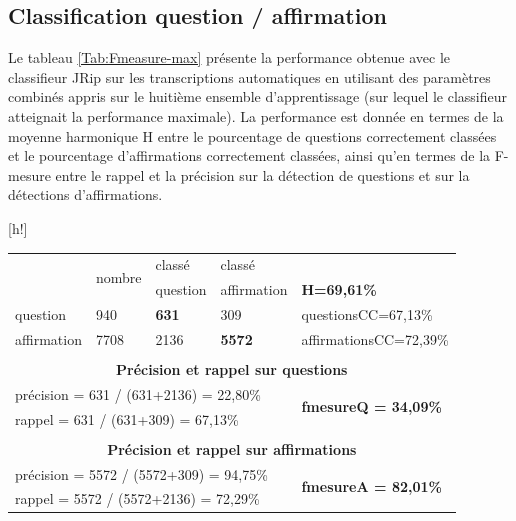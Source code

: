 \documentclass{style/these}
\makeatletter
\renewcommand\familydefault{ptm}
\newenvironment{aTable}%
  {%
   \renewcommand{\familydefault}{lmtt}\selectfont
  \@float{table}}
  {\end@float}
\makeatother
\begin{document}
\begin{part}
\chapter{Classification question / affirmation}
\renewcommand{\rightmark}{Classification question / affirmation}
\renewcommand{\leftmark}{Annexe F}

Le tableau \ref{Tab:Fmeasure-max} présente la performance obtenue avec le classifieur JRip sur les transcriptions automatiques en utilisant des paramètres combinés appris sur le huitième ensemble d’apprentissage (sur lequel le classifieur atteignait la performance maximale). La performance est donnée en termes de la moyenne harmonique H entre le pourcentage de questions correctement classées et le pourcentage d'affirmations correctement classées, ainsi qu'en termes de la F-mesure entre le rappel et la précision sur la détection de questions et sur la détections d'affirmations.

\begin{aTable}[h!]
\hspace*{-1ex}
\begin{tabular}{|p{2.4cm}|p{1.4cm}|p{2.1cm}|p{2.3cm}|p{4cm}|}
\cline{2-4}
\multicolumn{1}{c|}{}	& \multirow{2}{*}{nombre} 	& classé 		& classé 		& \multicolumn{1}{c}{}					\\
\multicolumn{1}{c|}{}	&  				& question		& affirmation 		& \multicolumn{1}{l}{\textbf{\color{purple}H=69,61\%}} 	\\ \cline{1-4}
question   		&  940 				& \textbf{631} 		& 309    		& \multicolumn{1}{l}{questionsCC=67,13\%} 		\\ \cline{1-4}
affirmation  		& 7708 				& 2136 			& \textbf{5572}  	& \multicolumn{1}{l}{affirmationsCC=72,39\%}   		\\ \cline{1-4}

\multicolumn{5}{c}{}			   													\\ \hline
\multicolumn{5}{|c|}{\textbf{Précision et rappel sur questions}}			   									\\ \hline
\multicolumn{4}{|l|}{\footnotesize précision = 631 / (631+2136) = 22,80\%} 	& \multirow{2}{*}{\textbf{\color{purple}fmesureQ = 34,09\%}}	\\
\multicolumn{4}{|l|}{\footnotesize rappel = 631 / (631+309) = 67,13\%} 		& 								\\ \hline

\multicolumn{5}{c}{}			   													\\ \hline
\multicolumn{5}{|c|}{\textbf{Précision et rappel sur affirmations}}		 									\\ \hline
\multicolumn{4}{|l|}{\footnotesize précision = 5572 / (5572+309) = 94,75\%} 	& \multirow{2}{*}{\textbf{\color{purple}fmesureA = 82,01\%}}	\\
\multicolumn{4}{|l|}{\footnotesize rappel = 5572 / (5572+2136) = 72,29\%} 	& 								\\ \hline


\end{tabular}
\end{aTable}
\end{part}
\end{document}
